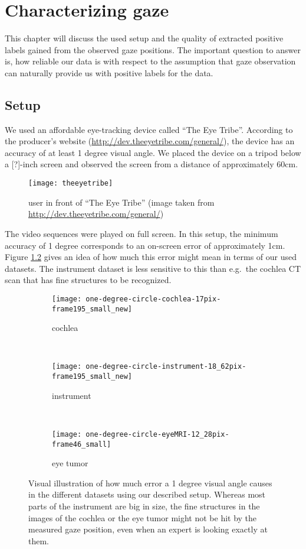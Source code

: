 \chapter{Characterizing gaze}
\label{chap:characterizing-gaze}
This chapter will discuss the used setup and the quality of extracted positive labels gained from the observed gaze positions. The important question to answer is, how reliable our data is with respect to the assumption that gaze observation can naturally provide us with positive labels for the data. 

\section{Setup}
We used an affordable eye-tracking device called ``The Eye Tribe''. According to the producer's website (\url{http://dev.theeyetribe.com/general/}), the device has an accuracy of at least 1 degree visual angle. We placed the device on a tripod below a [?]-inch screen  and observed the screen from a distance of approximately 60cm.  

\begin{figure}[ht]
	\centering

	\texttt{[image: theeyetribe]}	
	\caption{user in front of ``The Eye Tribe'' (image taken from \url{http://dev.theeyetribe.com/general/})}
	\label{fig:theeyetribe}
\end{figure}

The video sequences were played on full screen. In this setup, the minimum accuracy of 1 degree corresponds to an on-screen error of approximately 1cm. 
Figure \ref{fig:onedegreecircle} gives an idea of how much this error might mean in terms of our used datasets.
The instrument dataset is less sensitive to this than e.g.\ the cochlea CT scan that has fine structures to be recognized.

\begin{figure}[ht]
	\centering
	\begin{subfigure}[h]{0.31\textwidth}
		\texttt{[image: one-degree-circle-cochlea-17pix-frame195\_small\_new]}	
		\caption*{cochlea}
	\end{subfigure}
	~
	\begin{subfigure}[h]{0.31\textwidth}
		\texttt{[image: one-degree-circle-instrument-18\_62pix-frame195\_small\_new]}
		\caption*{instrument}
	\end{subfigure}
	~
	\begin{subfigure}[h]{0.31\textwidth}
		\texttt{[image: one-degree-circle-eyeMRI-12\_28pix-frame46\_small]}	
		\caption*{eye tumor}
	\end{subfigure}
	\caption{Visual illustration of how much error a 1 degree visual angle causes in the different datasets using our described setup. Whereas most parts of the instrument are big in size, the fine structures in the images of the cochlea or the eye tumor might not be hit by the measured gaze position, even when an expert is looking exactly at them.}
	\label{fig:onedegreecircle}
\end{figure}

